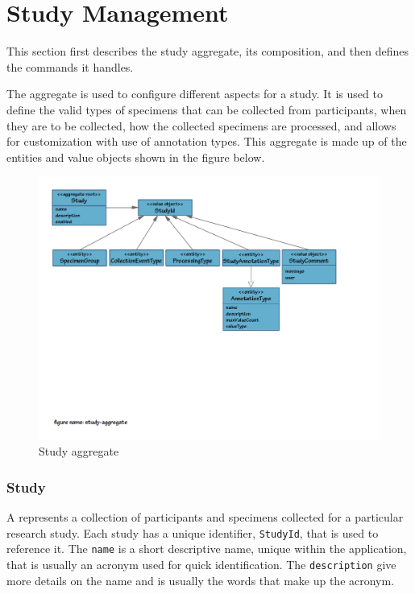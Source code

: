 \chapter{Study Management}

This section first describes the study aggregate, its composition, and then
defines the commands it handles.

The  aggregate is used to configure different aspects for a
study. It is used to define the valid types of specimens that can be collected
from participants, when they are to be collected, how the collected specimens
are processed, and allows for customization with use of annotation types. This
aggregate is made up of the entities and value objects shown in the figure
below.

\begin{figure}[H]
  \includegraphics[trim={9mm 85mm 36mm 9mm}, clip,
    width=1\textwidth]{images/study-aggregate}
  \caption{Study aggregate}
  \label{fig:study-aggregate}
\end{figure}

\subsection*{Study}

A  represents a collection of participants and specimens
collected for a particular research study. Each study has a unique identifier,
\texttt{StudyId}, that is used to reference it. The \texttt{name} is a short
descriptive name, unique within the application, that is usually an acronym
used for quick identification.  The \texttt{description} give more details on
the name and is usually the words that make up the acronym.

